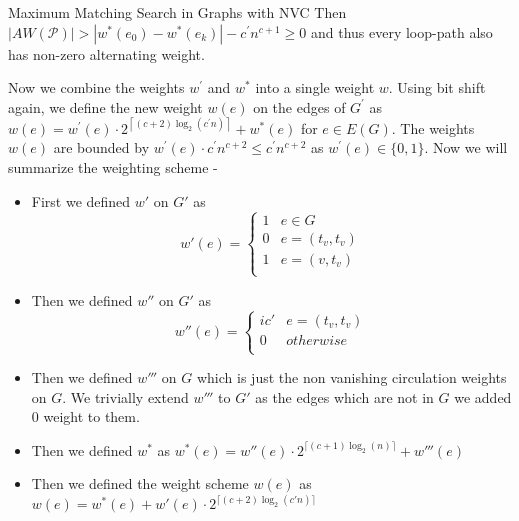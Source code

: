 \documentclass{beamer}
\begin{document}
\begin{frame}[allowframebreaks]{Maximum Matching Search in Graphs with NVC}
Then $|A W(\mathcal{P})|>\left|w^*\left(e_0\right)-w^*\left(e_k\right)\right|-c^{\prime} n^{c+1} \geq 0$ and thus every loop-path also has non-zero alternating weight.

Now we combine the weights $w^{\prime}$ and $w^*$ into a single weight $w$. Using bit shift again, we define the new weight $w(e)$ on the edges of $G^{\prime}$ as $w(e)=w^{\prime}(e) \cdot 2^{\left\lceil(c+2) \log _2\left(c^{\prime} n\right)\right\rceil}+w^*(e)$ for $e \in E(G)$. The weights $w(e)$ are bounded by $w^{\prime}(e) \cdot c^{\prime} n^{c+2} \leq c^{\prime} n^{c+2}$ as $w^{\prime}(e) \in\{0,1\}$.
\break
Now we will summarize the weighting scheme -
\begin{itemize}
	\item First we  defined $w'$ on $G'$ as 
		\begin{equation}
		w'(e) = \begin{cases}
			1 & e\in G\\
			0 & e=(t_v,t_v)\\
			1 & e=(v,t_v)\\
		\end{cases}
		\end{equation}
	\item Then we defined $w''$ on $G'$ as
		\begin{equation}
			w''(e) = \begin{cases}
				ic' & e=(t_v,t_v)\\
				0 & otherwise\\
			\end{cases}
		\end{equation}
	\item Then we defined $w'''$ on $G$ which is just the non vanishing circulation weights on $G$. We trivially extend $w'''$ to $G'$ as the edges which are not in $G$ we added $0$ weight to them.\\
	\item Then we defined $w^{*}$ as $w^{*}(e)=w''(e)\cdot 2^{\lceil (c+1) \log_2(n)\rceil}+w'''(e)$
	\item Then we defined the weight scheme $w(e) $ as $w(e)= w^{*}(e)+w'(e)\cdot 2^{\lceil (c+2)\log_2(c'n)\rceil}$	
	
\end{itemize}
\break


\end{frame}
\end{document}
